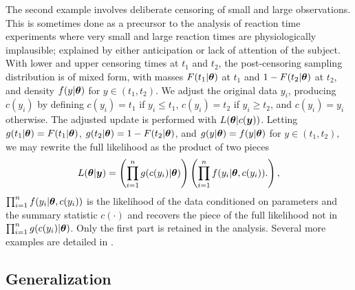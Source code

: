 \documentclass[ba]{imsart}
\def\bth{\mbox{\boldmath $\theta$}}
\newcommand{\by}{\mbox{\boldmath $y$}}
\begin{document}
The second example involves deliberate censoring of small and large observations. This is
sometimes done as a precursor to the analysis of reaction time experiments  \citep[e.g.,][]{ratcliff1993} where very small and large reaction times are physiologically implausible;  explained by either anticipation or lack of attention of the subject.  
With lower and upper censoring times at $t_1$ and $t_2$, the post-censoring sampling distribution is of mixed form, with masses $F(t_1|\bth)$ at $t_1$ and $1-F(t_2|\bth)$ at $t_2$,
and density $f(y | \bth)$ for $y \in (t_1, t_2)$.  We adjust the original data $y_i$,
producing $c(y_i)$ by defining $c(y_i)= t_1$ if $y_i \leq t_1$, $c(y_i)=t_2$ 
if $y_i \geq t_2$, and $c(y_i)=y_i$ otherwise.  
The adjusted update is performed with $L(\bth |c(\by))$.  
Letting $g(t_1|\bth) = F(t_1|\bth)$,
$g(t_2 | \bth) = 1 - F(t_2|\bth)$, and $g(y|\bth)=f(y|\bth)$ for
$y \in (t_1, t_2)$, we may rewrite the full 
likelihood as the product of two pieces
\begin{eqnarray}
\label{Censoring} 
L(\bth  | \by) =  \left( \prod_{i=1}^n g(c(y_i)  | \bth) \right) \left( \prod_{i=1}^n f(y_i|\bth,c(y_i)). \right) ,  
\end{eqnarray}
$\prod_{i=1}^n f(y_i|\bth,c(y_i))$ is the likelihood of the data conditioned on parameters and the summary statistic $c(\cdot)$ and recovers the piece of the full likelihood not in $ \prod_{i=1}^n g(c(y_i)  | \bth)$. Only the first part is retained in the analysis. Several more examples are detailed in \cite{lewis2014}.



\subsection{Generalization}
\end{document}
